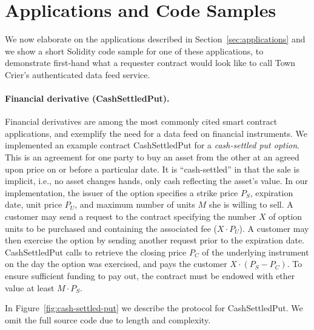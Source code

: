 \section{Applications and Code Samples}
\label{sec:applicationsfull}

We now elaborate 
on the applications described 
in Section~\ref{sec:applications}
and we show a short 
Solidity code sample for one of these applications,
to demonstrate first-hand what a requester  
contract would look like 
to call Town Crier's authenticated data feed service.


\paragraph{Financial derivative ({\sf CashSettledPut}).}
Financial derivatives are among the most commonly cited smart contract
applications,
and exemplify the need for a data feed on financial instruments.
We implemented an example contract {\sf CashSettledPut} for a {\em cash-settled put option}.
This is an agreement for one party to buy an asset from the other at an agreed upon price on or before a particular date.
It is ``cash-settled'' in that the sale is implicit, i.e., no asset changes hands, only cash reflecting the asset's value.
In our implementation, the issuer of the option specifies a strike price $P_S$, expiration date, unit price $P_U$, and maximum number of units $M$ she is willing to sell.
A customer may send a request to the contract specifying the number $X$ of option units to be purchased and containing the associated fee ($X \cdot P_U$).
A customer may then exercise the option by sending another request prior to the expiration date.
{\sf CashSettledPut} calls \tc to retrieve the closing price $P_C$ of the underlying instrument on the day the option was exercised, and pays the customer $X \cdot (P_S - P_C)$.
To ensure sufficient funding to pay out, the contract must be endowed with ether value at least $M \cdot P_S$.

In Figure~\ref{fig:cash-settled-put} we describe the protocol for {\sf CashSettledPut}.
We omit the full source code due to length and complexity.

